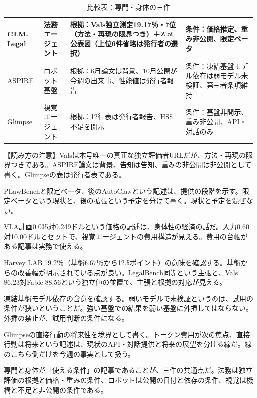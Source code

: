 \documentclass[lualatex,a4paper,10pt]{jlreq}
\begin{document}
\begin{table}[htbp]\centering\footnotesize
\caption{比較表：専門・身体の三件}
\begin{tabularx}{0.96\linewidth}{@{}lXXX@{}}
\toprule
GLM-Legal & 法務エージェント & 根拠：Vals独立測定19.17％・7位（方法・再現の限界つき）＋Z.ai公表図（上位6件省略は発行者の選択） & 条件：価格推定、重み非公開、限定ベータ \\
\midrule
ASPIRE & ロボット基盤 & 根拠：6月論文は背景、10月公開が今週の出来事、性能値は発行者報告 & 条件：凍結基盤モデル依存は弱モデル未検証、第三者条項維持 \\
\midrule
Glimpse & 視覚エージェント & 根拠：12行表は発行者報告、HSS不足を開示 & 条件：基盤非開示、重み非公開、API・対話のみ \\
\bottomrule
\end{tabularx}
\end{table}
\begin{tcolorbox}[colback=SurveySoft,colframe=SurveyRule,arc=1mm,boxrule=0.4pt,left=2mm,right=2mm]
【読み方の注意】Valsは本号唯一の真正な独立評価者URLだが、方法・再現の限界つきである。ASPIRE論文は背景、告知は告知、重みの非公開は非公開として書く。Glimpseの表は発行者表である。
\end{tcolorbox}
PLawBenchと限定ベータ、後のAutoClawという記述は、提供の段階を示す。限定ベータという現状と、後の拡張という予定を分けて書く。現状と予定を混ぜない。

VLA計画0.035対0.249ドルという価格の記述は、身体性の経済の話だ。入力0.60対10.00ドルとセットで、視覚エージェントの費用構造が見える。費用の台帳がある記事は実務で使える。

Harvey LAB 19.2％（基盤6.67％から12.5ポイント）の意味を確認する。基盤からの改善幅が明示されている点が良い。LegalBench同等という主張と、Vals 86.23対Fable 88.56という独立値の並置で、主張と根拠の対応が見える。

凍結基盤モデル依存の含意を確認する。弱いモデルで未検証というのは、試用の条件が狭いということだ。強い基盤での結果を弱い基盤に外挿してはならない。外挿の禁止が、試用判断の条件になる。

Glimpseの直接行動の将来性を境界として書く。トークン費用が次の焦点、直接行動は将来という記述は、現状のAPI・対話提供と将来の展望を分ける線だ。線のこちら側だけを今週の事実として扱う。

専門と身体が「使える条件」の記事であることが、三件の共通点だ。法務は独立評価の根拠と価格・重みの条件、ロボットは公開の日付と依存の条件、視覚は機構と不足と非公開の条件である。
\end{document}
